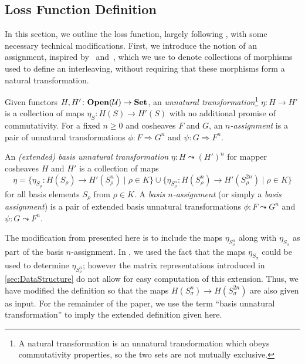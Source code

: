 %
\subsection{Loss Function Definition}
\label{ssec:LossFunction}

In this section, we outline the loss function, largely following \cite{chambers2023bounding}, with some necessary technical modifications.
First, we introduce the notion of an assignment, inspired by~\cite{Robinson2020} and~\cite{nlab:unnatural_transformation}, which we use to denote collections of morphisms used to define an interleaving, without requiring that these morphisms form a natural transformation.

\begin{definition}
\label{def:assignment}
Given functors $H,H'\colon\mathbf{Open}(\mathcal{U}) \to \mathbf{Set}$, an \emph{unnatural transformation}\footnote{A  natural transformation is an unnatural transformation which obeys commutativity properties, so the two sets are not mutually exclusive.}   $\eta\colon H \rightarrow H'$ is a collection of maps $\eta_S\colon H(S) \to H'(S)$ with no additional promise of commutativity. 
For a fixed $n \geq 0$ and cosheaves $F$ and $G$, an \emph{$n$-assignment} is a pair of unnatural transformations $\phi\colon F \Rightarrow G^n$ and $\psi\colon G \Rightarrow F^n$.

An \emph{(extended) basis unnatural transformation} 
$\eta\colon H \leadsto (H')^n$ for mapper cosheaves $H$ and $H'$ is a collection of maps
\begin{equation*}
    \eta = \{ \eta_{S_\rho}\colon H(S_\rho) \to H'(S_\rho^n) \mid \rho \in K\} 
        \cup \{\eta_{S_\rho^n}\colon H(S_\rho^n) \to H'(S_\rho^{2n}) \mid \rho \in K\}
\end{equation*}
for all basis elements $S_\rho$ from $\rho \in K$. 
A \emph{basis $n$-assignment} (or simply a \emph{basis assignment}) is a pair of extended basis unnatural transformations
$
\phi\colon F \leadsto G^n
$
and 
$
\psi\colon G \leadsto F^n.
$
\end{definition}
The modification from \cite{chambers2023bounding} presented here is to include the maps $\eta_{S^n_\sigma}$ along with $\eta_{S_\sigma}$ as part of the basis $n$-assignment. 
In \cite{chambers2023bounding}, we used the fact that the maps $\eta_{S_\sigma}$ could be used to determine $\eta_{S^n_\sigma}$; however the matrix representations introduced in \cref{sec:DataStructure} do not allow for easy computation of this extension. 
Thus, we have modified the definition so that the maps $H(S_\sigma^n) \to H(S_\sigma^{2n})$ are also given as input. 
For the remainder of the paper, we use the term ``basis unnatural transformation'' to imply the extended definition given here. 

